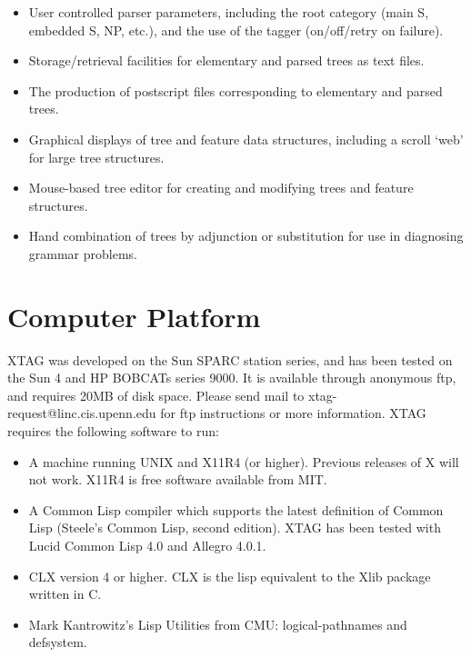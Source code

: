 {\begin{itemize}
\item User controlled parser parameters, including the root
category (main S, embedded S, NP, etc.), and the use of the tagger
(on/off/retry on failure).

\item Storage/retrieval facilities for elementary and parsed trees as
text files.

\item The production of postscript files corresponding to elementary
and parsed trees.

\item Graphical displays of tree and feature data structures,
including a scroll `web' for large tree structures.

\item Mouse-based tree editor for creating and modifying trees and
feature structures.

\item Hand combination of trees by adjunction or substitution for use
in diagnosing grammar problems.

\end{itemize}


\section{Computer Platform}

XTAG was developed on the Sun SPARC station series, and has been
tested on the Sun 4 and HP BOBCATs series 9000.  It is available
through anonymous ftp, and requires 20MB of disk space.  Please send
mail to xtag-request@linc.cis.upenn.edu for ftp instructions or more
information.  XTAG requires the following software to run:

\begin{itemize}

\item A machine running UNIX and X11R4 (or higher). Previous releases
of X will not work.  X11R4 is free software available from MIT.

\item A Common Lisp compiler which supports the latest definition of Common 
Lisp (Steele's Common Lisp, second edition).  XTAG has been tested
with Lucid Common Lisp 4.0 and Allegro 4.0.1.

\item CLX version 4 or higher. CLX is the lisp equivalent to the Xlib package 
written in C.

\item Mark Kantrowitz's Lisp Utilities from CMU: logical-pathnames and
defsystem.


\end{itemize}}

